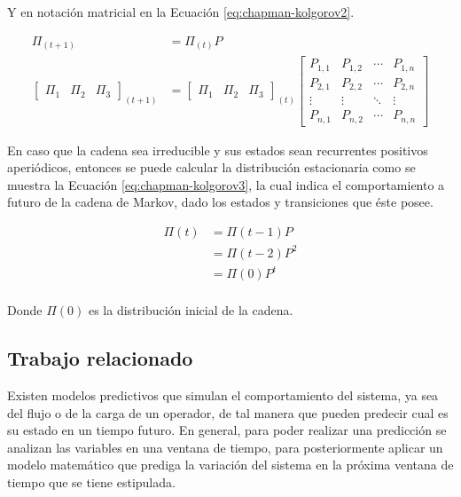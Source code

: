 Y en notaci\'on matricial en la Ecuaci\'on \ref{eq:chapman-kolgorov2}.

\begin{equation} \label{eq:chapman-kolgorov2}
\begin{split}
	\Pi_{(t+1)} &= \Pi_{(t)}P\\
	\begin{bmatrix}
		\Pi_1 & \Pi_2 & \Pi_3
	\end{bmatrix} _{(t+1)}
	&= \begin{bmatrix}
		\Pi_1 & \Pi_2 & \Pi_3
	\end{bmatrix} _{(t)}
	\begin{bmatrix}
		P_{1,1} & P_{1,2} & \cdots & P_{1,n} \\
		P_{2,1} & P_{2,2} & \cdots & P_{2,n} \\
		\vdots  & \vdots  & \ddots & \vdots  \\
		P_{n,1} & P_{n,2} & \cdots & P_{n,n}
	\end{bmatrix}
\end{split}
\end{equation}

\normalsize{En caso que la cadena sea irreducible y sus estados sean recurrentes positivos aperi\'odicos}, entonces se puede calcular la distribuci\'on estacionaria como se muestra la Ecuaci\'on \ref{eq:chapman-kolgorov3}, la cual indica el comportamiento a futuro de la cadena de Markov, dado los estados y transiciones que \'este posee.

\begin{equation} \label{eq:chapman-kolgorov3}
\begin{split}
	\Pi (t) &= \Pi (t-1)P \\
				  &= \Pi (t-2)P^{2}\\
				  &= \Pi (0)P^{t}\\
\end{split}
\end{equation}

\normalsize{Donde $\Pi (0)$ es la distribuci\'on inicial de la cadena.}

\subsection{Trabajo relacionado}
\label{subSec:markovTrabajo}
Existen modelos predictivos \normalsize{que} simulan el comportamiento del sistema, ya sea del flujo o de la carga de un operador, de tal manera que pueden predecir cual es su estado en un tiempo futuro. En general, para poder realizar una predicci\'on se analizan las variables en una ventana de tiempo, para posteriormente aplicar un modelo matem\'atico que prediga la variaci\'on del sistema en la pr\'oxima ventana de tiempo que se tiene estipulada.

